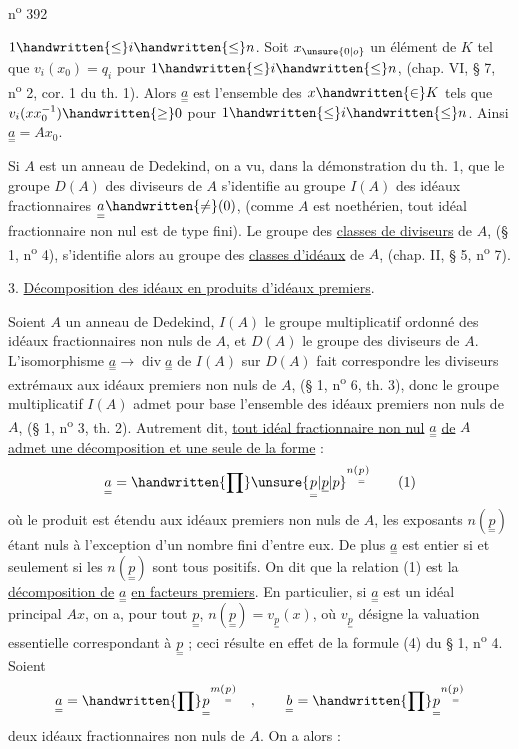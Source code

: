 \hfill n\textsuperscript{o} 392

$1\handwritten{\leq}i\handwritten{\leq}n$. Soit $x_{\unsure{0|o}}$ un élément de\unsure{,} $K$ tel que $v_i(x_0)=q_i$ pour $1\handwritten{\leq}i\handwritten{\leq}n$, (chap. VI, § 7, n\textsuperscript{o} 2, cor. 1 du th. 1). Alors $\underset{=}{a}$ est l'ensemble des $x\handwritten{\in}K$ tels que $v_i(xx_0^{-1})\handwritten{\geq}0$ pour $1\handwritten{\leq}i\handwritten{\leq}n$. Ainsi $\underset{=}{a}=Ax_0$.

Si $A$ est un anneau de Dedekind, on a vu, dans la démonstration du th. 1, que le groupe $D(A)$ des diviseurs de $A$ s'identifie au groupe $I(A)$ des idéaux fractionnaires $\underset{=}{a}\handwritten{\ne}(0)$, (comme $A$ est noethérien, tout idéal fractionnaire non nul est de type fini). Le groupe des \uline{classes de diviseurs} de $A$, (§ 1, n\textsuperscript{o} 4), s'identifie alors au groupe des \uline{classes d'idéaux} de $A$, (chap. II, § 5, n\textsuperscript{o} 7).

3. \uline{Décomposition des idéaux en produits d'idéaux premiers}.

Soient $A$ un anneau de Dedekind, $I(A)$ le groupe multiplicatif ordonné des idéaux fractionnaires non nuls de $A$, et $D(A)$ le groupe des diviseurs de $A$. L'isomorphisme $\underset{=}{a}\longrightarrow\operatorname{div}\underset{=}{a}$ de $I(A)$ sur $D(A)$ fait correspondre les diviseurs extrémaux aux idéaux premiers non nuls de $A$, (§ 1, n\textsuperscript{o} 6, th. 3), donc le groupe multiplicatif $I(A)$ admet pour base l'ensemble des idéaux premiers non nuls de $A$, (§ 1, n\textsuperscript{o} 3, th. 2). Autrement dit, \uline{tout idéal fractionnaire non nul} $\underset{=}{a}$ \uline{de} $A$ \uline{admet une décomposition et une seule de la forme} :
\[
\underset{=}{a}=\handwritten{\prod}\unsure{\underset{=}{p}|\underline{p}|p}^{n(\underset{=}{p})}\tag*{(1)}
\]
où le produit est étendu aux idéaux premiers non nuls de $A$, les exposants $n(\underset{=}{p})$ étant nuls à l'exception d'un nombre fini d'entre eux. De plus $\underset{=}{a}$ est entier si et seulement si les $n(\underset{=}{p})$ sont tous positifs. On dit que la relation (1) est la \uline{décomposition de} $\underset{=}{a}$ \uline{en facteurs premiers}. En particulier, si $\underset{=}{a}$ est un idéal principal $Ax$, on a, pour tout $\underset{=}{p}$, $n(\underset{=}{p})=v_{\underset{=}{p}}(x)$, où $v_{\underset{=}{p}}$ désigne la valuation essentielle correspondant à $\underset{=}{p}$ ; ceci résulte en effet de la formule (4) du § 1, n\textsuperscript{o} 4. Soient
\[
\underset{=}{a}=\handwritten{\prod}\underset{=}{p}^{m(\underset{=}{p})}\quad,\qquad \underset{=}{b}=\handwritten{\prod}\underset{=}{p}^{n(\underset{=}{p})}
\]
deux idéaux fractionnaires non nuls de $A$. On a alors :
